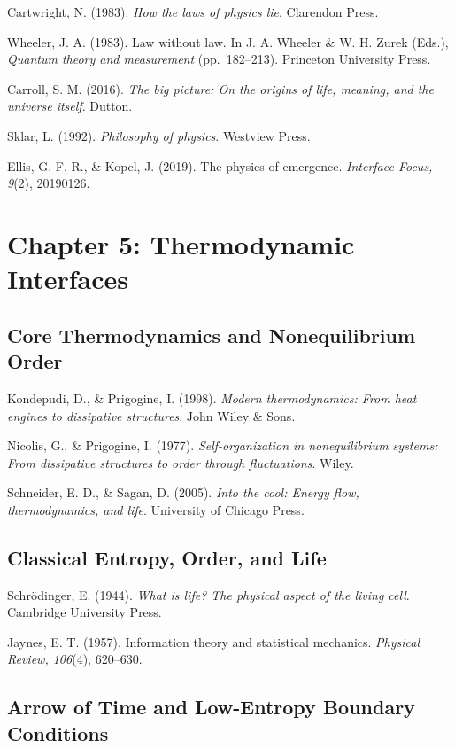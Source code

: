 \documentclass[
  openright]{book}
\begin{document}
Cartwright, N. (1983). \emph{How the laws of physics lie}. Clarendon
Press.

Wheeler, J. A. (1983). Law without law. In J. A. Wheeler \& W. H. Zurek
(Eds.), \emph{Quantum theory and measurement} (pp.~182--213). Princeton
University Press.

Carroll, S. M. (2016). \emph{The big picture: On the origins of life,
meaning, and the universe itself}. Dutton.

Sklar, L. (1992). \emph{Philosophy of physics}. Westview Press.

Ellis, G. F. R., \& Kopel, J. (2019). The physics of emergence.
\emph{Interface Focus, 9}(2), 20190126.

\section{Chapter 5: Thermodynamic
Interfaces}\label{chapter-5-thermodynamic-interfaces}

\subsection{Core Thermodynamics and Nonequilibrium
Order}\label{core-thermodynamics-and-nonequilibrium-order}

Kondepudi, D., \& Prigogine, I. (1998). \emph{Modern thermodynamics:
From heat engines to dissipative structures}. John Wiley \& Sons.

Nicolis, G., \& Prigogine, I. (1977). \emph{Self-organization in
nonequilibrium systems: From dissipative structures to order through
fluctuations}. Wiley.

Schneider, E. D., \& Sagan, D. (2005). \emph{Into the cool: Energy flow,
thermodynamics, and life}. University of Chicago Press.

\subsection{Classical Entropy, Order, and
Life}\label{classical-entropy-order-and-life}

Schrödinger, E. (1944). \emph{What is life? The physical aspect of the
living cell}. Cambridge University Press.

Jaynes, E. T. (1957). Information theory and statistical mechanics.
\emph{Physical Review, 106}(4), 620--630.

\subsection{Arrow of Time and Low-Entropy Boundary
Conditions}\label{arrow-of-time-and-low-entropy-boundary-conditions}
\end{document}
